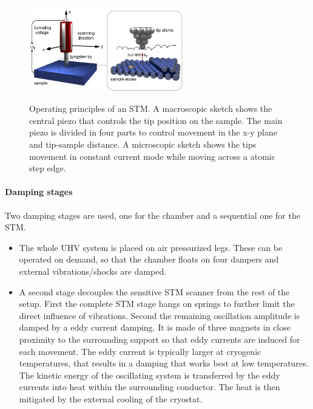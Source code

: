 \begin{figure}\centering
	
\includegraphics[width=0.6\textwidth]{./images/stm-rutgers-modified.jpg}
\label{fig:STM-tip}

	\caption{Operating principles of an STM. A macroscopic sketch  shows the central piezo that controls the tip position on the sample. The main piezo is divided in four parts to control movement in the x-y plane and tip-sample distance\cite{STM-rutgers}. A microscopic sketch shows the tips movement in constant current mode while moving across a atomic step edge.}
	\label{fig:STM-sketch}
\end{figure}

\paragraph{Damping stages}
Two damping stages are used, one for the chamber and a sequential one for the STM.
\begin{itemize}
	\item The whole UHV system is placed on air pressurized legs. These can be operated on demand, so that the chamber floats on four dampers and external vibrations/shocks are damped.
	\item A second stage decouples the sensitive STM scanner from the rest of the setup. First the complete STM stage hangs on springs to further limit the direct influence of vibrations. Second the remaining oscillation amplitude is damped by a eddy current damping. It is made of three magnets in close proximity to the surrounding support so that eddy currents are induced for each movement. The eddy current is typically larger at cryogenic temperatures, that results in a damping that works best at low temperatures. The kinetic energy of the oscillating system is transferred by the eddy currents into heat within the surrounding conductor. The heat is then mitigated by the external cooling of the cryostat.
\end{itemize}

